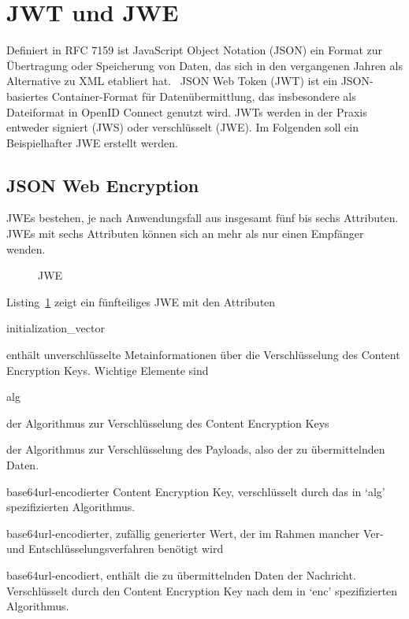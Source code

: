 \section{JWT und JWE}
Definiert in RFC 7159 ist JavaScript Object Notation (JSON) ein Format
zur Übertragung oder Speicherung von Daten, das sich in den vergangenen Jahren
als Alternative zu XML etabliert hat.~
JSON Web Token (JWT) ist ein JSON-basiertes Container-Format für
Datenübermittlung, das insbesondere als Dateiformat in OpenID Connect genutzt
wird. JWTs werden in der Praxis entweder signiert (JWS) oder verschlüsselt
(JWE).
Im Folgenden soll ein Beispielhafter JWE erstellt werden.

\subsection{JSON Web Encryption}
JWEs bestehen, je nach Anwendungsfall aus insgesamt fünf bis sechs
Attributen. JWEs mit sechs Attributen können sich an mehr als nur einen
Empfänger wenden.

\begin{figure}[h]
    \scalebox{.8}{
        
    }
    \caption{JWE}\label{ls: JWE}
\end{figure}

Listing~\ref{ls: JWE} zeigt ein fünfteiliges JWE mit den Attributen

\begin{labeling}{initialization\_vector}
    \item [header] enthält unverschlüsselte Metainformationen über die
    Verschlüsselung des Content Encryption Keys. Wichtige Elemente sind
    \begin{labeling}{alg}
        \item[alg] der Algorithmus zur Verschlüsselung des Content Encryption
        Keys
        \item[enc] der Algorithmus zur Verschlüsselung des Payloads, also der zu
        übermittelnden Daten.
    \end{labeling}
    \item [encrypted\_key] base64url-encodierter Content Encryption Key,
    verschlüsselt durch das in `alg' spezifizierten Algorithmus.
    \item [initialization\_vector] base64url-encodierter, zufällig generierter
    Wert, der im Rahmen mancher Ver- und Entschlüsselungsverfahren benötigt wird
    \item[ciphertext] base64url-encodiert, enthält die zu übermittelnden Daten der
    Nachricht. Verschlüsselt durch den Content Encryption Key nach dem in `enc'
    spezifizierten Algorithmus.
    \item[tag]
\end{labeling}

